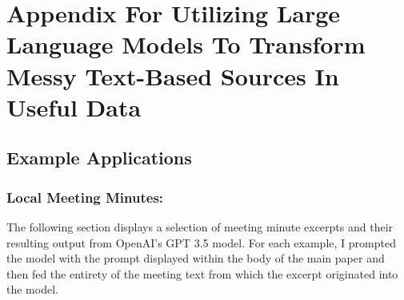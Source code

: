 \chapter{Appendix For Utilizing Large Language Models To Transform Messy Text-Based Sources In Useful Data}
\label{app:Chapter3}
\SingleSpacing*
{}


\section{Example Applications}

\subsection{Local Meeting Minutes:}
The following section displays a selection of meeting minute excerpts and their resulting output from OpenAI's GPT 3.5 model. For each example, I prompted the model with the prompt displayed within the body of the main paper and then fed the entirety of the meeting text from which the excerpt originated into the model.



